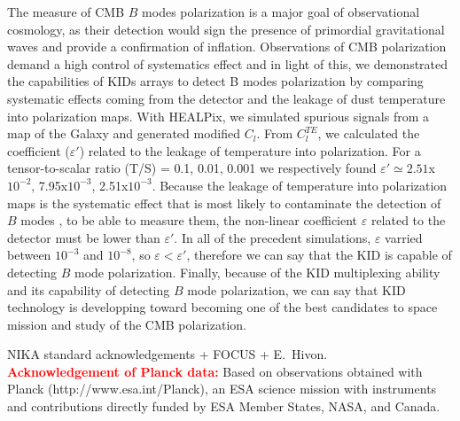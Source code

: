 \documentclass[twocolumn, traditabstract]{aa}
\newcommand{\todo}[1]{\textcolor{red}{\textbf{#1}}}
\begin{document}
The measure of CMB $B$ modes polarization is a major goal of observational cosmology, as their detection would sign the presence of primordial gravitational waves and provide a confirmation of inflation. Observations of CMB polarization demand a high control of systematics effect and in light of this, we demonstrated the capabilities of KIDs arrays to detect B modes polarization by comparing systematic effects coming from the detector and the leakage of dust temperature into polarization maps. With HEALPix, we simulated spurious signals from a map of the Galaxy and generated modified $C_{l}$. From $C_{l}^{TE}$, we calculated the coefficient ($\varepsilon'$) related to the leakage of temperature into polarization. For a tensor-to-scalar ratio (T/S) = 0.1, 0.01, 0.001 we respectively found $\varepsilon' \simeq 2.51$x$10^{-2}$, 7.95x$10^{-3}$, 2.51x$10^{-3}$. Because the leakage of temperature into polarization maps is the systematic effect that is most likely to contaminate the detection of $B$ modes , to be able to measure them, the non-linear coefficient $\varepsilon$ related to the detector must be lower than $\varepsilon'$. In all of the precedent simulations, $\varepsilon $ varried between $10^{-3}$ and $10^{-8}$, so $\varepsilon < \varepsilon'$, therefore we can say that the KID is capable of detecting $B$ mode polarization. Finally, because of the KID multiplexing ability and its capability of detecting $B$ mode polarization, we can say that KID technology is developping toward becoming one of the best candidates to space mission and study of the CMB polarization.
 


\begin{acknowledgements}
NIKA standard acknowledgements + FOCUS + E.~Hivon.\\
\todo{Acknowledgement of Planck data:} Based on observations obtained with Planck
(http://www.esa.int/Planck), an ESA science mission with instruments and
contributions directly funded by ESA Member States, NASA, and Canada.
\end{acknowledgements}
\end{document}

